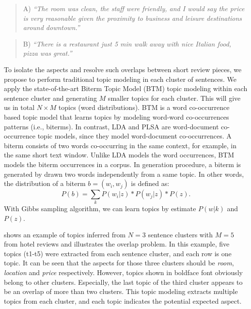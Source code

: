 \begin{quote}
A) \textit{``The room was clean, the staff were friendly, and I would say the price is very reasonable given the proximity to business and leisure destinations around downtown.''}
\end{quote}

\begin{quote}
B) \textit{``There is a restaurant just 5 min walk away with nice Italian food, pizza was great.''}
\end{quote}


To isolate the aspects and resolve such overlaps between short review pieces, we propose to perform traditional topic modeling in each cluster of sentences.
We apply the state-of-the-art Biterm Topic Model (BTM) \cite{cheng2014btm} topic modeling within each sentence cluster and generating $M$ smaller topics for each cluster. 
This will give us in total $N\times M$ topics (word distributions). 
BTM is a word co-occurrence based topic model that learns topics by modeling word-word co-occurrences patterns (i.e., biterms). In contrast, LDA and PLSA are word-document co-occurrence topic models, since they model word-document co-occurrences.
A biterm consists of two words co-occurring in the same context, for example, in the same short text window. Unlike LDA models the word occurrences, BTM models the biterm occurrences in a corpus. In generation procedure, a biterm is generated by drawn two words independently from a same topic. In other words, the distribution of a biterm $b=(w_i,w_j)$ is defined as:
\begin{equation}
	P(b) = \sum_k{P(w_i|z)*P(w_j|z)*P(z)}.
\end{equation}
With Gibbs sampling algorithm, we can learn topics by estimate $P(w|k)$ and $P(z)$.

 shows an example of topics inferred from $N=3$
sentence clusters with $M=5$ from hotel reviews and illustrates the overlap problem.
In this example, five topics (t1-t5) were extracted from each sentence cluster, 
and each row is one topic. 
It can be seen that the aspects for those 
three clusters should be {\em room}, {\em location} and {\em price} 
respectively.
However, topics shown in boldface font obviously belong to 
other clusters.  Especially, the last topic of the third cluster 
appears to be an overlap of more than two clusters.
This topic modeling extracts multiple topics from each cluster, and each topic indicates the potential expected aspect.

